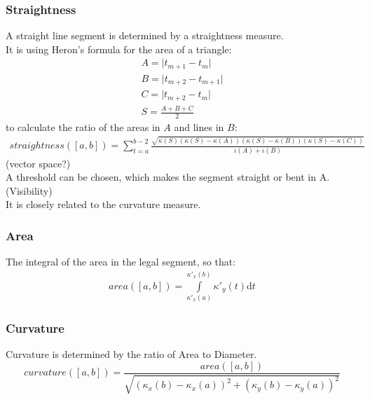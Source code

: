 \documentclass{article}
\begin{document}
\subsubsection{Straightness}
A straight line segment is determined by a straightness measure.\\
It is using Heron's formula for the area of a triangle:
\begin{align*}
A=\lvert t_{m+1}-t_{m} \rvert\\
B=\lvert t_{m+2} - t_{m+1} \rvert\\
C=\lvert t_{m+2} - t_{m} \rvert\\
S=\frac{A+B+C}{2}
\end{align*}
to calculate the ratio of the areas in $A$ and lines in $B$:
\begin{align}
straightness([a,b])=\sum_{t=a}^{b-2}\frac{\sqrt{\kappa(S)(\kappa(S)-\kappa(A))(\kappa(S)-\kappa(B))(\kappa(S)-\kappa(C))}}{\iota(A)+\iota(B)}
\end{align}
(vector space?)\\
\iffalse
\newcommand\norm[1]{\left\lVert#1\right\rVert}
The element of Banach spaces $x \in (B,\norm{\cdot}),(A,\norm{\cdot})$ respectively with the zero-start bounded variation metric:\\
\begin{equation}
d(x,x) = \norm{x}_{bv_{0}} = \sum_{i=1}^{\infty}\lvert x_{i+1} - x_{i} \rvert
\end{equation}
\begin{align}
straightness([a,b])=\frac{\int \limits _{[a,b] \subseteq A}\lvert\gamma(t)\rvert\mathrm{d}t}{\int \limits _{[a,b] \subseteq B}\lvert\gamma(t)\rvert\mathrm{d}t}
\end{align}
\fi
A threshold can be chosen, which makes the segment straight or bent in A. (Visibility)\\
It is closely related to the curvature measure.

\subsubsection{Area}
The integral of the area in the legal segment, so that:
\begin{align}
area([a,b])= \int \limits _{\kappa'_{x}(a)}^{\kappa'_{x}(b)} \kappa'_{y}(t)\mathrm{d}t
\end{align}

\subsubsection{Curvature}
Curvature is determined by the ratio of Area to Diameter.
\begin{equation}
curvature([a,b]) = \frac{area([a,b])}{\sqrt{(\kappa_{x}(b) - \kappa_{x}(a))^2+(\kappa_{y}(b) - \kappa_{y}(a))^2}}
\end{equation}
\end{document}
